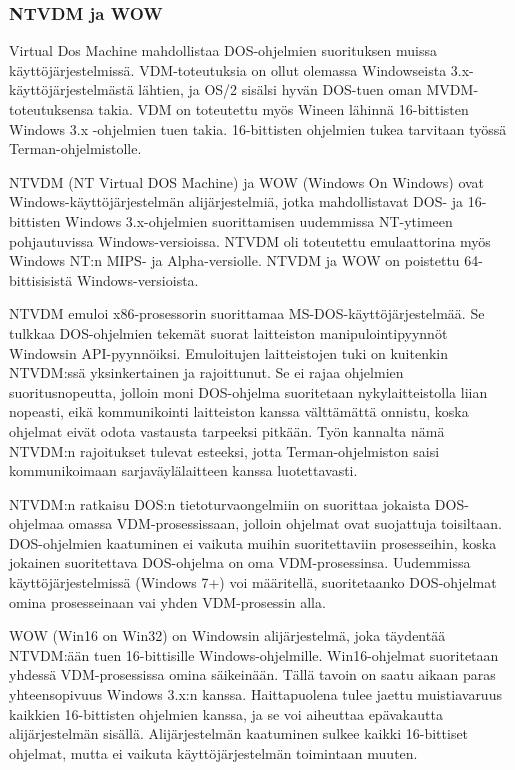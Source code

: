 \subsubsection{NTVDM ja WOW}
Virtual Dos Machine mahdollistaa DOS-ohjelmien suorituksen muissa käyttöjärjestelmissä. VDM-toteutuksia on ollut olemassa Windowseista 3.x-käyttöjärjestelmästä lähtien, ja OS/2 sisälsi hyvän DOS-tuen oman MVDM-toteutuksensa takia. VDM on toteutettu myös Wineen lähinnä 16-bittisten Windows 3.x -ohjelmien tuen takia. 16-bittisten ohjelmien tukea tarvitaan työssä Terman-ohjelmistolle.

NTVDM (NT Virtual DOS Machine) ja WOW (Windows On Windows) ovat Windows-käyttöjärjestelmän alijärjestelmiä, jotka mahdollistavat DOS- ja 16-bittisten Windows 3.x-ohjelmien suorittamisen uudemmissa NT-ytimeen pohjautuvissa Windows-versioissa. NTVDM oli toteutettu emulaattorina myös Windows NT:n MIPS- ja Alpha-versiolle. NTVDM ja WOW on poistettu 64-bittisisistä Windows-versioista. \citep{ntvdm_2}

NTVDM emuloi x86-prosessorin suorittamaa MS-DOS-käyttöjärjestelmää. Se tulkkaa DOS-ohjelmien tekemät suorat laitteiston manipulointipyynnöt Windowsin API-pyynnöiksi. Emuloitujen laitteistojen tuki on kuitenkin NTVDM:ssä yksinkertainen ja rajoittunut. Se ei rajaa ohjelmien suoritusnopeutta, jolloin moni DOS-ohjelma suoritetaan nykylaitteistolla liian nopeasti, eikä kommunikointi laitteiston kanssa välttämättä onnistu, koska ohjelmat eivät odota vastausta tarpeeksi pitkään. Työn kannalta nämä NTVDM:n rajoitukset tulevat esteeksi, jotta Terman-ohjelmiston saisi kommunikoimaan sarjaväylälaitteen kanssa luotettavasti.

NTVDM:n ratkaisu DOS:n tietoturvaongelmiin on suorittaa jokaista DOS-ohjelmaa omassa VDM-prosessissaan, jolloin ohjelmat ovat suojattuja toisiltaan. DOS-ohjelmien kaatuminen ei vaikuta muihin suoritettaviin prosesseihin, koska jokainen suoritettava DOS-ohjelma on oma VDM-prosessinsa. Uudemmissa käyttöjärjestelmissä (Windows 7+) voi määritellä, suoritetaanko DOS-ohjelmat omina prosesseinaan vai yhden VDM-prosessin alla.

WOW (Win16 on Win32) on Windowsin alijärjestelmä, joka täydentää NTVDM:ään tuen 16-bittisille Windows-ohjelmille. Win16-ohjelmat suoritetaan yhdessä VDM-prosessissa omina säikeinään. Tällä tavoin on saatu aikaan paras yhteensopivuus Windows 3.x:n kanssa. Haittapuolena tulee jaettu muistiavaruus kaikkien 16-bittisten ohjelmien kanssa, ja se voi aiheuttaa epävakautta alijärjestelmän sisällä. Alijärjestelmän kaatuminen sulkee kaikki 16-bittiset ohjelmat, mutta ei vaikuta käyttöjärjestelmän toimintaan muuten. \citep{ntvdm_kb}



